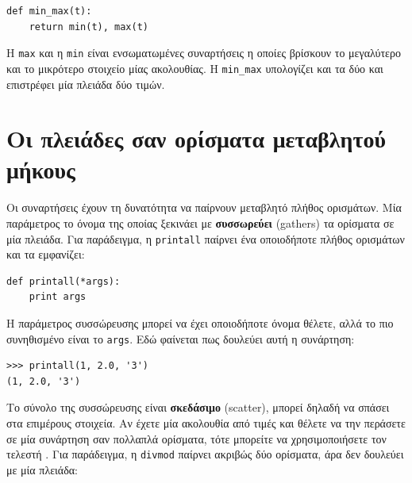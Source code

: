 \documentclass[10pt]{book}
\begin{document}
\begin{verbatim}
def min_max(t):
    return min(t), max(t)
\end{verbatim}
%
Η {\tt max} και η {\tt min} είναι ενσωματωμένες συναρτήσεις η οποίες βρίσκουν το μεγαλύτερο και το μικρότερο στοιχείο μίας ακολουθίας. Η \verb"min_max" υπολογίζει και τα δύο και επιστρέφει μία πλειάδα δύο τιμών.


 
\section{Οι πλειάδες σαν ορίσματα μεταβλητού μήκους}

Οι συναρτήσεις έχουν τη δυνατότητα να παίρνουν μεταβλητό πλήθος ορισμάτων. Μία παράμετρος το όνομα της οποίας ξεκινάει με {\tt *} {\bf συσσωρεύει} (gathers) τα ορίσματα σε μία πλειάδα. Για παράδειγμα, η {\tt printall} παίρνει ένα οποιοδήποτε πλήθος ορισμάτων και τα εμφανίζει:

\begin{verbatim}
def printall(*args):
    print args
\end{verbatim}
%
Η παράμετρος συσσώρευσης μπορεί να έχει οποιοδήποτε όνομα θέλετε, αλλά το πιο συνηθισμένο είναι το {\tt args}. Εδώ φαίνεται πως δουλεύει αυτή η συνάρτηση:

\begin{verbatim}
>>> printall(1, 2.0, '3')
(1, 2.0, '3')
\end{verbatim}
%
Το σύνολο της συσσώρευσης είναι {\bf σκεδάσιμο} (scatter), μπορεί δηλαδή να σπάσει στα επιμέρους στοιχεία. Αν έχετε μία ακολουθία από τιμές και θέλετε να την περάσετε σε μία συνάρτηση σαν πολλαπλά ορίσματα, τότε μπορείτε να χρησιμοποιήσετε τον τελεστή {\tt *}. Για παράδειγμα, η {\tt divmod} παίρνει ακριβώς δύο ορίσματα, άρα δεν δουλεύει με μία πλειάδα:


%
\end{document}
